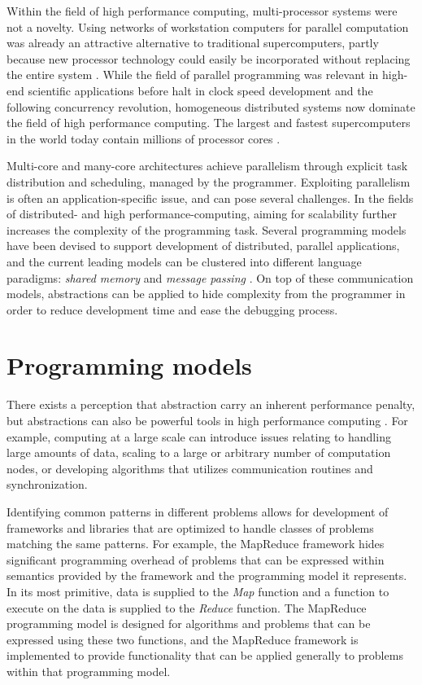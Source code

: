 \documentclass{uit-report}
\begin{document}
Within the field of high performance computing, multi-processor systems were not a novelty. Using networks of workstation computers for parallel computation was already an attractive alternative to traditional supercomputers, partly because new processor technology could easily be incorporated without replacing the entire system \cite{wilkinson_allen_2005}. While the field of parallel programming was relevant in high-end scientific applications before halt in clock speed development and the following concurrency revolution, homogeneous distributed systems now dominate the field of high performance computing. The largest and fastest supercomputers in the world today contain millions of processor cores \cite{top500}.


Multi-core and many-core architectures achieve parallelism through explicit task distribution and scheduling, managed by the programmer. Exploiting parallelism is often an application-specific issue, and can pose several challenges. In the fields of distributed- and high performance-computing, aiming for scalability further increases the complexity of the programming task. Several programming models have been devised to support development of distributed, parallel applications, and the current leading models can be clustered into different language paradigms: \emph{shared memory }and \emph{message passing} \cite{pgas_languages}. On top of these communication models, abstractions can be applied to hide complexity from the programmer in order to reduce development time and ease the debugging process. 

\section{Programming models}

There exists a perception that abstraction carry an inherent performance penalty, but abstractions can also be powerful tools in high performance computing \cite{mccandless_lumsdaine_1997}. For example, computing at a large scale can introduce issues relating to handling large amounts of data, scaling to a large or arbitrary number of computation nodes, or developing algorithms that utilizes communication routines and synchronization.

Identifying common patterns in different problems allows for development of frameworks and libraries that are optimized to handle classes of problems matching the same patterns. For example, the MapReduce framework hides significant programming overhead of problems that can be expressed within semantics provided by the framework and the programming model it represents. In its most primitive, data is supplied to the \emph{Map} function and a function to execute on the data is supplied to the \emph{Reduce} function. The MapReduce programming model is designed for algorithms and problems that can be expressed using these two functions, and the MapReduce framework is implemented to provide functionality that can be applied generally to problems within that programming model.
\end{document}
